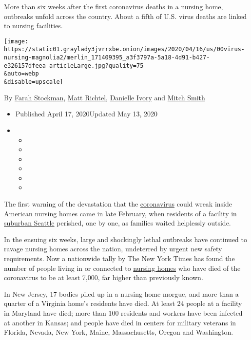 More than six weeks after the first coronavirus deaths in a nursing
home, outbreaks unfold across the country. About a fifth of U.S. virus
deaths are linked to nursing facilities.

\texttt{[image: https://static01.graylady3jvrrxbe.onion/images/2020/04/16/us/00virus-nursing-magnolia2/merlin\_171409395\_a3f3797a-5a18-4d91-b427-e326157dfeea-articleLarge.jpg?quality=75\\\&auto=webp\\\&disable=upscale]}

By \href{https://www.nytimes3xbfgragh.onion/by/farah-stockman}{Farah
Stockman},
\href{https://www.nytimes3xbfgragh.onion/by/matt-richtel}{Matt Richtel},
\href{https://www.nytimes3xbfgragh.onion/by/danielle-ivory}{Danielle
Ivory} and
\href{https://www.nytimes3xbfgragh.onion/by/mitch-smith}{Mitch Smith}

\begin{itemize}
\item
  Published April 17, 2020Updated May 13, 2020
\item
  \begin{itemize}
  \item
  \item
  \item
  \item
  \item
  \item
  \end{itemize}
\end{itemize}

The first warning of the devastation that the
\href{https://www.nytimes3xbfgragh.onion/2020/05/07/business/coronavirus-nursing-homes.html}{coronavirus}
could wreak inside American
\href{https://www.nytimes3xbfgragh.onion/2020/05/07/business/coronavirus-nursing-homes.html}{nursing
homes} came in late February, when residents of a
\href{https://www.nytimes3xbfgragh.onion/2020/03/21/us/coronavirus-nursing-home-kirkland-life-care.html}{facility
in suburban Seattle} perished, one by one, as families waited helplessly
outside.

In the ensuing six weeks, large and shockingly lethal outbreaks have
continued to ravage nursing homes across the nation, undeterred by
urgent new safety requirements. Now a nationwide tally by The New York
Times has found the number of people living in or connected to
\href{https://www.nytimes3xbfgragh.onion/2020/05/13/nyregion/nursing-homes-coronavirus-new-york.html}{nursing
homes} who have died of the coronavirus to be at least 7,000, far higher
than previously known.

In New Jersey, 17 bodies piled up in a nursing home morgue, and more
than a quarter of a Virginia home's residents have died. At least 24
people at a facility in Maryland have died; more than 100 residents and
workers have been infected at another in Kansas; and people have died in
centers for military veterans in Florida, Nevada, New York, Maine,
Massachusetts, Oregon and Washington.

